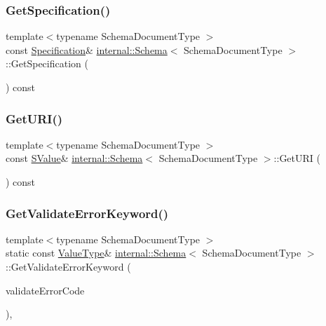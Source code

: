 \subsubsection{\texorpdfstring{Get\+Specification()}{GetSpecification()}}
{\footnotesize\ttfamily template$<$typename Schema\+Document\+Type $>$ \\
const \hyperlink{structSpecification}{Specification}\& \hyperlink{classinternal_1_1Schema}{internal\+::\+Schema}$<$ Schema\+Document\+Type $>$\+::Get\+Specification (\begin{DoxyParamCaption}{ }\end{DoxyParamCaption}) const\hspace{0.3cm}{\ttfamily [inline]}}

\mbox{\label{classinternal_1_1Schema_a8b48d8d85c2828a1067227582f3efd5f}} 
\subsubsection{\texorpdfstring{Get\+U\+R\+I()}{GetURI()}}
{\footnotesize\ttfamily template$<$typename Schema\+Document\+Type $>$ \\
const \hyperlink{classinternal_1_1Schema_ab3a07540a27d4cc2b0e260290c5c5771}{S\+Value}\& \hyperlink{classinternal_1_1Schema}{internal\+::\+Schema}$<$ Schema\+Document\+Type $>$\+::Get\+U\+RI (\begin{DoxyParamCaption}{ }\end{DoxyParamCaption}) const\hspace{0.3cm}{\ttfamily [inline]}}

\mbox{\label{classinternal_1_1Schema_ac2fc7b192866ec6bbb2187194cb23cd2}} 
\subsubsection{\texorpdfstring{Get\+Validate\+Error\+Keyword()}{GetValidateErrorKeyword()}}
{\footnotesize\ttfamily template$<$typename Schema\+Document\+Type $>$ \\
static const \hyperlink{classinternal_1_1Schema_a8976b6d7e2a885483d0b51d941019340}{Value\+Type}\& \hyperlink{classinternal_1_1Schema}{internal\+::\+Schema}$<$ Schema\+Document\+Type $>$\+::Get\+Validate\+Error\+Keyword (\begin{DoxyParamCaption}\item[{\hyperlink{group__RAPIDJSON__ERRORS_ga2e1f88f94a5d9a6817a5de0ed2f0105a}{Validate\+Error\+Code}}]{validate\+Error\+Code }\end{DoxyParamCaption})\hspace{0.3cm}{\ttfamily [inline]}, {\ttfamily [static]}}

